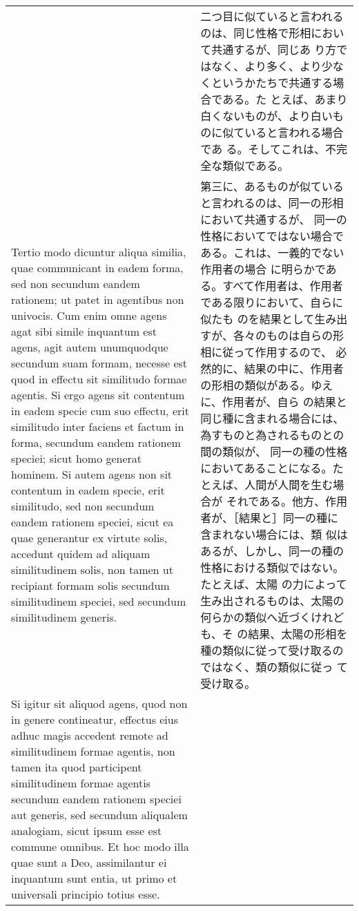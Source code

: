 \documentclass[10pt]{jsarticle} %
\begin{document}
\begin{longtable}{p{21em}p{21em}}
&

二つ目に似ていると言われるのは、同じ性格で形相において共通するが、同じあ
 り方ではなく、より多く、より少なくというかたちで共通する場合である。た
 とえば、あまり白くないものが、より白いものに似ていると言われる場合であ
 る。そしてこれは、不完全な類似である。

\\

Tertio modo dicuntur aliqua similia, quae communicant in eadem forma,
 sed non secundum eandem rationem; ut patet in agentibus non
 univocis. Cum enim omne agens agat sibi simile inquantum est agens,
 agit autem unumquodque secundum suam formam, necesse est quod in
 effectu sit similitudo formae agentis. Si ergo agens sit contentum in
 eadem specie cum suo effectu, erit similitudo inter faciens et factum
 in forma, secundum eandem rationem speciei; sicut homo generat
 hominem. Si autem agens non sit contentum in eadem specie, erit
 similitudo, sed non secundum eandem rationem speciei, sicut ea quae
 generantur ex virtute solis, accedunt quidem ad aliquam similitudinem
 solis, non tamen ut recipiant formam solis secundum similitudinem
 speciei, sed secundum similitudinem generis. 

&

第三に、あるものが似ていると言われるのは、同一の形相において共通するが、
 同一の性格においてではない場合である。これは、一義的でない作用者の場合
 に明らかである。すべて作用者は、作用者である限りにおいて、自らに似たも
 のを結果として生み出すが、各々のものは自らの形相に従って作用するので、
 必然的に、結果の中に、作用者の形相の類似がある。ゆえに、作用者が、自ら
 の結果と同じ種に含まれる場合には、為すものと為されるものとの間の類似が、
 同一の種の性格においてあることになる。たとえば、人間が人間を生む場合が
 それである。他方、作用者が、［結果と］同一の種に含まれない場合には、類
 似はあるが、しかし、同一の種の性格における類似ではない。たとえば、太陽
 の力によって生み出されるものは、太陽の何らかの類似へ近づくけれども、そ
 の結果、太陽の形相を種の類似に従って受け取るのではなく、類の類似に従っ
 て受け取る。

\\

Si igitur sit aliquod agens, quod non in genere contineatur, effectus
 eius adhuc magis accedent remote ad similitudinem formae agentis, non
 tamen ita quod participent similitudinem formae agentis secundum eandem
 rationem speciei aut generis, sed secundum aliqualem analogiam, sicut
 ipsum esse est commune omnibus. Et hoc modo illa quae sunt a Deo,
 assimilantur ei inquantum sunt entia, ut primo et universali principio
 totius esse.


\end{longtable}
\end{document}
